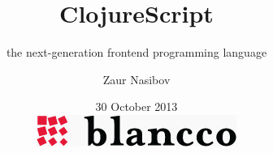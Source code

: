 \title{ClojureScript}
\subtitle{ the next-generation frontend programming language}

\author{Zaur Nasibov}



\date{30 October 2013
  \\
  \noindent
  \hspace{0.7\textwidth}
  {\includegraphics[scale=0.25]{blancco-logo}}
}
\subject{Frondend development}

\frame{\titlepage}

